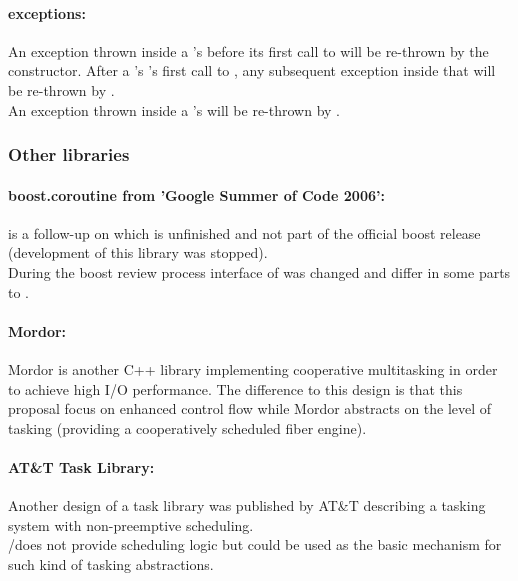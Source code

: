 \paragraph*{exceptions:}
An exception thrown inside a \pullcoro's \corofunction before its first call to
\pushcoroop will be re-thrown by the \pullcoro constructor. After a \pullcoro's
\corofunction's first call to \pushcoroop, any subsequent exception inside that
\corofunction will be re-thrown by \pullcoroop.\\
An exception thrown inside a \pushcoro's \corofunction will be re-thrown by
\pushcoroop.


\subsubsection*{Other libraries}
\paragraph*{boost.coroutine from 'Google Summer of Code 2006':}
\boostcoroutine is a follow-up on \boostcorosum which is unfinished and
not part of the official boost release (development of this library was
stopped).\\
During the boost review process interface of \boostcoroutine was changed and
differ in some parts to \boostcorosum.

\paragraph*{Mordor:}
Mordor\cite{mordor} is another C++ library implementing cooperative multitasking
in order to achieve high I/O performance. The difference to this design is that
this proposal focus on enhanced control flow while Mordor\cite{mordor} abstracts
on the level of tasking (providing a cooperatively scheduled fiber engine).

\paragraph*{AT\&T Task Library:}
Another design of a task library was published by AT\&T\cite{atnt1989}
describing a tasking system with non-preemptive scheduling.\\
\pushcoro/\pullcoro does not provide scheduling logic but could be used as the
basic mechanism for such kind of tasking abstractions.

